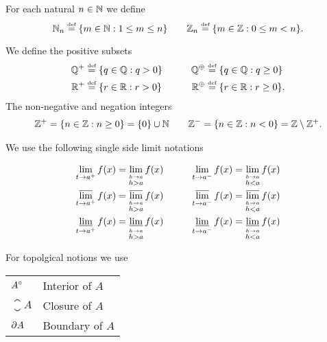 
For each natural \(n\in\mathbb{N}\) we define
\begin{equation*}
\mathbb{N}_n \stackrel{\mbox{\upshape\tiny def}}{=} \{m\in\mathbb{N}: 1\leq m \leq n\} \qquad
\mathbb{Z}_n \stackrel{\mbox{\upshape\tiny def}}{=} \{m\in\mathbb{Z}: 0\leq m < n\}.
\end{equation*}

We define the positive subsets
\begin{alignat*}{2}
\mathbb{Q}^+ &\stackrel{\mbox{\upshape\tiny def}}{=} \{q\in\mathbb{Q}: q>0\}
 &\qquad
 \mathbb{Q}^\oplus &\stackrel{\mbox{\upshape\tiny def}}{=} \{q\in\mathbb{Q}: q\geq 0\} \\
\mathbb{R}^+ &\stackrel{\mbox{\upshape\tiny def}}{=} \{r\in\mathbb{R}: r>0\}
 &\qquad
 \mathbb{R}^\oplus &\stackrel{\mbox{\upshape\tiny def}}{=} \{r\in\mathbb{R}: r\geq 0\}.
\end{alignat*}
The non-negative and negation integers
\begin{align*}
\mathbb{Z}^+ = \{n\in\mathbb{Z}: n\geq 0\} = \{0\} \cup \mathbb{N}
\qquad
\mathbb{Z}^- =  \{n\in\mathbb{Z}: n < 0\} = \mathbb{Z} \setminus \mathbb{Z}^+.
\end{align*}


We use the following single side limit notations

\begin{alignat*}{2}
\lim_{t\to a^+} f(x) &= \lim_{\stackrel{h\to a}{h>a}} f(x)
 &\qquad
  \lim_{t\to a^-} f(x) &= \lim_{\stackrel{h\to a}{h<a}} f(x) \\
\varlimsup_{t\to a^+} f(x) &= \varlimsup_{\stackrel{h\to a}{h>a}} f(x)
 &\qquad
  \varlimsup_{t\to a^-} f(x) &= \varlimsup_{\stackrel{h\to a}{h<a}} f(x) \\
\varliminf_{t\to a^+} f(x) &= \varliminf_{\stackrel{h\to a}{h>a}} f(x)
 &\qquad
  \varliminf_{t\to a^-} f(x) &= \varliminf_{\stackrel{h\to a}{h<a}} f(x)
\end{alignat*}

For topolgical notions we use
\begin{center}
\begin{tabular}{ll}
\(A^{\circ}\) & Interior of $A$ \\
\(\closure{A}\) & Closure of $A$ \\
\(\partial A\) & Boundary of $A$ \\
\end{tabular}
\end{center}

